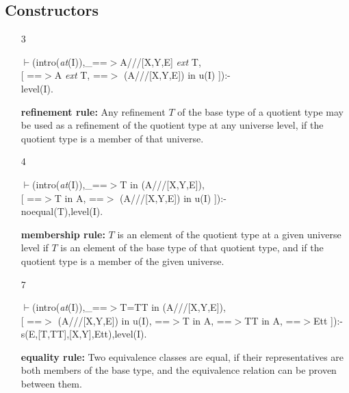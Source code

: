 \documentclass[11pt]{report}
\begin{document}
 \subsection{Constructors}
  
 \begin{enumerate}
 \item[3]
\begin{sf}\begin{tabbing}
$\vdash$(intro(\mbox{\it at}(I)),\_\hspace{0.1em}==$>$A///[X,Y,E] \mbox{\it ext} T, \\[-0.15ex]
\hspace{2em}[ ==$>$A \mbox{\it ext} T, ==$>$ (A///[X,Y,E]) in u(I) ]):-\\[-0.15ex]
\hspace{2em}level(I).
\end{tabbing}\end{sf}

 {\bf refinement rule:}
 Any refinement $T$ of the base type of a quotient type 
 may be
 used as a refinement of the quotient type at any universe level,
 if the quotient type is a member of that universe. 
 \item[4]
\begin{sf}\begin{tabbing}
$\vdash$(intro(\mbox{\it at}(I)),\_\hspace{0.1em}==$>$T in (A///[X,Y,E]), \\[-0.15ex]
\hspace{2em}[ ==$>$T in A, ==$>$ (A///[X,Y,E]) in u(I) ]):-\\[-0.15ex]
\hspace{2em}noequal(T),level(I).
\end{tabbing}\end{sf}

 {\bf membership rule:}  
 ${T}$ is an element of the quotient type at a given universe level
 if $T$ is an element of the base type of that quotient type,
 and if the quotient type is a member of the given universe.
  
 \item[7]
\begin{sf}\begin{tabbing}
$\vdash$(intro(\mbox{\it at}(I)),\_\hspace{0.1em}==$>$T=TT in (A///[X,Y,E]),\\[-0.15ex]
\hspace{2em}[ ==$>$ (A///[X,Y,E]) in u(I), ==$>$T in A, ==$>$TT in A, ==$>$Ett ]):-\\[-0.15ex]
\hspace{2em}s(E,[T,TT],[X,Y],Ett),level(I).
\end{tabbing}\end{sf}

 {\bf equality rule:}
 Two equivalence classes are equal, if their representatives are
 both members of the base type, and the equivalence relation
 can be proven between them.
 \end{enumerate}
  
\end{document}
